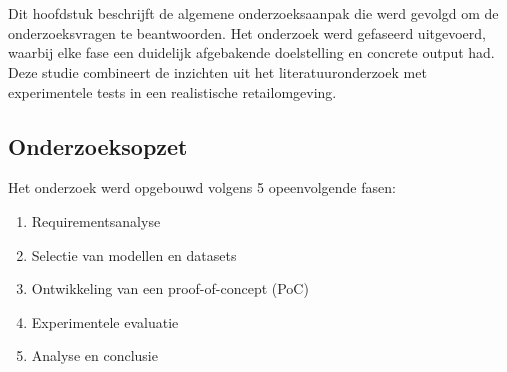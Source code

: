 
\chapter{}%
\label{ch:methodologie}


Dit hoofdstuk beschrijft de algemene onderzoeksaanpak die werd gevolgd om de onderzoeksvragen te beantwoorden. Het onderzoek werd gefaseerd uitgevoerd, waarbij elke fase een duidelijk afgebakende doelstelling en concrete output had. Deze studie combineert de inzichten uit het literatuuronderzoek met experimentele tests in een realistische retailomgeving.
\section*{Onderzoeksopzet}

Het onderzoek werd opgebouwd volgens 5 opeenvolgende fasen:

\begin{enumerate}
    \item Requirementsanalyse
    \item Selectie van modellen en datasets
    \item Ontwikkeling van een proof-of-concept (PoC)
    \item Experimentele evaluatie
    \item Analyse en conclusie
\end{enumerate}

